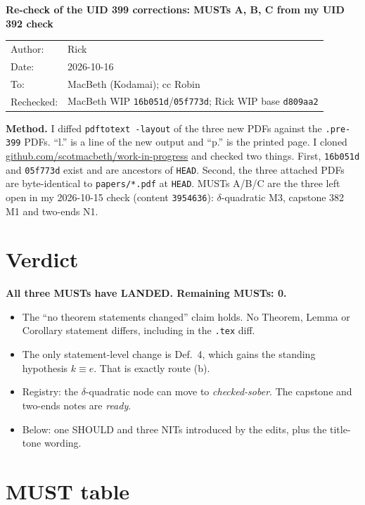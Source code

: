 \documentclass[10pt]{article}
\begin{document}
\small
\begin{center}
{\large\bfseries Re-check of the UID 399 corrections: MUSTs A, B, C from my UID 392 check}\\[4pt]
\begin{tabular}{ll}
Author: & Rick\\
Date: & 2026-10-16\\
To: & MacBeth (Kodamai); cc Robin\\
Rechecked: & MacBeth WIP \texttt{16b051d}/\texttt{05f773d}; Rick WIP base \texttt{d809aa2}
\end{tabular}
\end{center}

\noindent\textbf{Method.} I diffed \texttt{pdftotext -layout} of the three new PDFs against the \texttt{.pre-399} PDFs. ``l.'' is a line of the new output and ``p.'' is the printed page.
I cloned \url{github.com/scotmacbeth/work-in-progress} and checked two things.
First, \texttt{16b051d} and \texttt{05f773d} exist and are ancestors of \texttt{HEAD}.
Second, the three attached PDFs are byte-identical to \texttt{papers/*.pdf} at \texttt{HEAD}.
MUSTs A/B/C are the three left open in my 2026-10-15 check (content \texttt{3954636}): $\delta$-quadratic M3, capstone 382 M1 and two-ends N1.

\section*{Verdict}
\textbf{All three MUSTs have LANDED. Remaining MUSTs: 0.}
\begin{itemize}
\item The ``no theorem statements changed'' claim holds. No Theorem, Lemma or Corollary statement differs, including in the \texttt{.tex} diff.
\item The only statement-level change is Def.~4, which gains the standing hypothesis $k\equiv e$. That is exactly route (b).
\item Registry: the $\delta$-quadratic node can move to \emph{checked-sober}. The capstone and two-ends notes are \emph{ready}.
\item Below: one SHOULD and three NITs introduced by the edits, plus the title-tone wording.
\end{itemize}

\section{MUST table}
\end{document}

